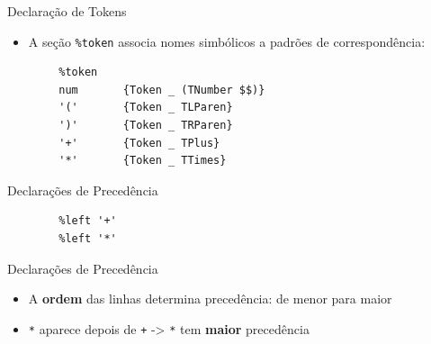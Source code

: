 \begin{frame}[fragile]{Declaração de Tokens}

    \begin{itemize}

        \item
        A seção \texttt{\%token} associa nomes simbólicos a
        padrões de correspondência:
    \end{itemize}

    \begin{lstlisting}
        %token
        num       {Token _ (TNumber $$)}
        '('       {Token _ TLParen}
        ')'       {Token _ TRParen}
        '+'       {Token _ TPlus}
        '*'       {Token _ TTimes}
    \end{lstlisting}
\end{frame}


\begin{frame}[fragile]{Declarações de Precedência}

    \begin{lstlisting}
        %left '+'
        %left '*'
    \end{lstlisting}
\end{frame}

\begin{frame}[fragile]{Declarações de Precedência}

    \begin{itemize}

        \item
        A \textbf{ordem} das linhas determina precedência: de menor para maior
        \item
        \texttt{*} aparece depois de
        \texttt{+} -> \texttt{*} tem
        \textbf{maior} precedência
    \end{itemize}
\end{frame}

